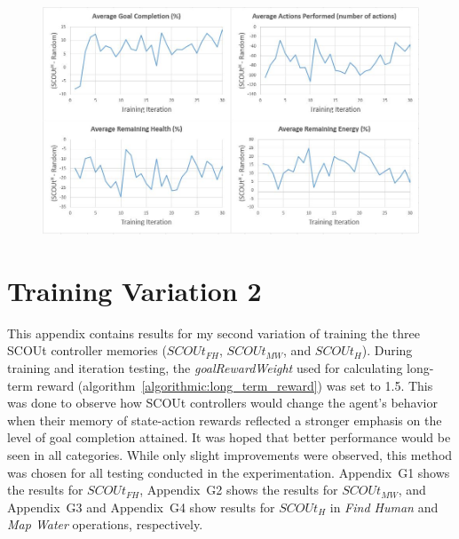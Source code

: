 \begin{appxfig}[H]
\begin{figure}[H]
  \centering
  \includegraphics[width=1.0\columnwidth]{Figures/Results/TrainingVariation1/Hybrid-MapWater.JPG}
\end{figure}
\caption{Iteration testing performance results for $SCOUt_{H}$ attempting \textit{Map Water} using setup variation 1 (see subsection~\ref{subsec:training_variations}). All graphs show the controller's average difference in performance compared to $Random$ ($SCOUt_{H}$ average - $Random$ average) VS the number of training iterations completed.}
\label{appendix:hybrid_training_mw_variation1}
\end{appxfig}







\pagebreak
\tocless\section{Training Variation 2} \label{sec:training_variation2}
This appendix contains results for my second variation of training the three SCOUt controller memories ($SCOUt_{FH}$, $SCOUt_{MW}$, and $SCOUt_{H}$).
During training and iteration testing, the \textit{goalRewardWeight} used for calculating long-term reward (algorithm~\ref{algorithmic:long_term_reward}) was set to 1.5.
This was done to observe how SCOUt controllers would change the agent's behavior when their memory of state-action rewards reflected a stronger emphasis on the level of goal completion attained.
It was hoped that better performance would be seen in all categories.
While only slight improvements were observed, this method was chosen for all testing conducted in the experimentation.
Appendix~G1 shows the results for $SCOUt_{FH}$, Appendix~G2 shows the results for $SCOUt_{MW}$, and Appendix~G3 and Appendix~G4 show results for $SCOUt_{H}$ in \textit{Find Human} and \textit{Map Water} operations, respectively.

